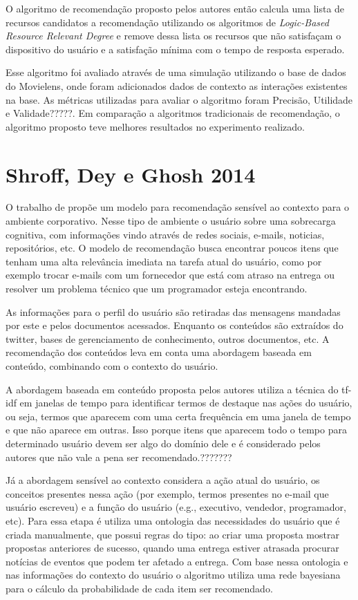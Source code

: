 O algoritmo de recomendação proposto pelos autores então calcula uma lista de recursos candidatos a recomendação
utilizando os algoritmos de \textit{Logic-Based Resource Relevant Degree} e remove dessa lista os recursos que não satisfaçam o
dispositivo do usuário e a satisfação mínima com o tempo de resposta esperado.

Esse algoritmo foi avaliado através de uma simulação utilizando o base de dados do Movielens, onde foram adicionados dados de
contexto as interações existentes na base. As métricas utilizadas para avaliar o algoritmo foram Precisão, Utilidade e
Validade?????. Em comparação a algoritmos tradicionais de recomendação, o algoritmo proposto teve melhores resultados no
experimento realizado.

\section{Shroff, Dey e Ghosh 2014}

O trabalho de  propõe um modelo para recomendação sensível ao contexto para o ambiente
corporativo. Nesse tipo de ambiente o usuário sobre uma sobrecarga cognitiva, com informações vindo através de redes
sociais, e-mails, noticias, repositórios, etc. O modelo de recomendação busca encontrar poucos itens que tenham uma alta
relevância imediata na tarefa atual do usuário, como por exemplo trocar e-mails com um fornecedor que está com atraso
na entrega ou resolver um problema técnico que um programador esteja encontrando.

As informações para o perfil do usuário são retiradas das mensagens mandadas por este e pelos documentos acessados.
Enquanto os conteúdos são extraídos do twitter, bases de gerenciamento de conhecimento, outros documentos, etc. A
recomendação dos conteúdos leva em conta uma abordagem baseada em conteúdo, combinando com o contexto do usuário.

A abordagem baseada em conteúdo proposta pelos autores utiliza a técnica do tf-idf em janelas de tempo para identificar
termos de destaque nas ações do usuário, ou seja, termos que aparecem com uma certa frequência em uma janela de tempo
e que não aparece em outras. Isso porque itens que aparecem todo o tempo para determinado usuário devem ser algo do
domínio dele e é considerado pelos autores que não vale a pena ser recomendado.???????

Já a abordagem sensível ao contexto considera a ação atual do usuário, os conceitos presentes nessa ação (por exemplo,
termos presentes no e-mail que usuário escreveu) e a função do usuário (e.g., executivo, vendedor, programador, etc).
Para essa etapa é utiliza uma ontologia das necessidades do usuário que é criada manualmente, que possui regras do tipo:
ao criar uma proposta mostrar propostas anteriores de sucesso, quando uma entrega estiver atrasada procurar notícias
de eventos que podem ter afetado a entrega. Com base nessa ontologia e nas informações do contexto do usuário o
algoritmo utiliza uma rede bayesiana para o cálculo da probabilidade de cada item ser recomendado.

